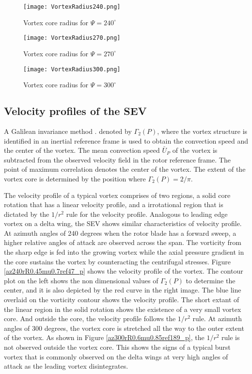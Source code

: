 \documentclass[%
 reprint,
 showkeys,
 amsmath,amssymb,
 aps,
]{revtex4-1}
\begin{document}
 


\begin{figure}[!ht]
	\texttt{[image: VortexRadius240.png]} 
	\caption{Vortex core radius for $\Psi = 240^\circ$}
	\label{VortexRadius240}
	
	\texttt{[image: VortexRadius270.png]}
	\caption{Vortex core radius for $\Psi = 270^\circ$}
	\label{VortexRadius270}
	
	\texttt{[image: VortexRadius300.png]}
	\caption{Vortex core radius for $\Psi = 300^\circ$}
	\label{VortexRadius300}
	
\end{figure}

\subsection{Velocity profiles of the SEV}

A Galilean invariance method \cite{graftieaux2001combining}. 
denoted by $\Gamma_2(P)$, where the vortex structure is identified in an inertial reference frame is used to obtain the convection speed and the center of the vortex. The mean convection speed $\bar{U}_P$ of the vortex is subtracted from the observed velocity field in the rotor reference frame. The point of maximum correlation denotes the center of the vortex. The extent of the vortex core is determined by the position where $\Gamma_2(P) = 2/\pi$.   

The velocity profile of a typical vortex comprises of two regions, a solid core rotation that has a linear velocity profile, and a irrotational region that is dictated by the $1/r^2$ rule for the velocity profile. Analogous to leading edge vortex on a delta wing, the SEV shows similar characteristics of velocity profile. At azimuth angles of 240 degrees when the rotor blade has a forward sweep, a higher relative angles of attack are observed across the span. The vorticity from the sharp edge is fed into the growing vortex while the axial pressure gradient in the core sustains the vortex by counteracting the centrifugal stresses. Figure \ref{az240rR0.45mu0.7ref47_p} shows the velocity profile of the vortex. The contour plot on the left shows the non dimensional values of $\Gamma_2(P)$ to determine the center, and it is also depicted by the red curve in the right image. The blue line overlaid on the vorticity contour shows the velocity profile. The short extant of the linear region in the solid rotation shows the existence of a very small vortex core. And outside the core, the velocity profile follows the $1/r^2$ rule. At azimuth angles of 300 degrees, the vortex core is stretched all the way to the outer extent of the vortex. As shown in Figure \ref{az300rR0.6mu0.85ref189_p}, the $1/r^2$ rule is not observed outside the vortex core. This shows the signs of a typical burst vortex that is commonly observed on the delta wings at very high angles of attack as the leading vortex disintegrates.    
\end{document}
